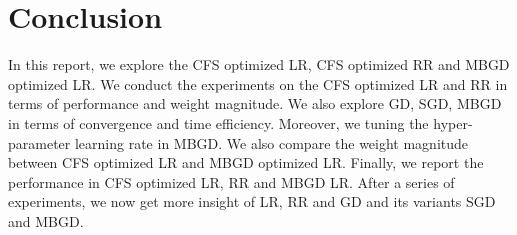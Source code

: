 \documentclass[journal, a4paper]{IEEEtran}
\begin{document}
\section{Conclusion}
In this report, we explore the CFS optimized LR, CFS optimized RR and MBGD optimized LR. We conduct the experiments on the CFS optimized LR and RR in terms of performance and weight magnitude. We also explore GD, SGD, MBGD in terms of convergence and time efficiency. Moreover, we tuning the hyper-parameter learning rate in MBGD. We also compare the weight magnitude between CFS optimized LR and MBGD optimized LR. Finally, we report the performance in CFS optimized LR, RR and MBGD LR. After a series of experiments, we now get more insight of LR, RR and GD and its variants SGD and MBGD. \par



\end{document}
